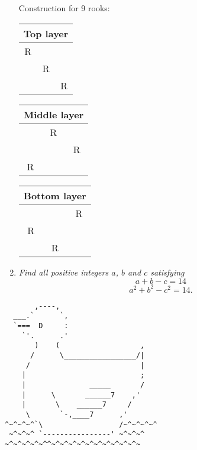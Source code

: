 \documentclass{article}
\begin{document}
\begin{enumerate}[1.]
Construction for 9 rooks:
\begin{table}[h]
\centering
\begin{tabular}{| c | c| c |}
\multicolumn{3}{c}{Top layer}\\
\hline
R& &\\
\hline
&R&\\
\hline
&&R\\
\hline
\end{tabular}
\quad
\begin{tabular}{| c | c| c |}
\multicolumn{3}{c}{Middle layer}\\
\hline
&R &\\
\hline
&&R\\
\hline
R&&\\
\hline
\end{tabular}
\quad
\begin{tabular}{| c | c| c |}
\multicolumn{3}{c}{Bottom layer}\\
\hline
& &R\\
\hline
R&&\\
\hline
&R&\\
\hline
\end{tabular}
\end{table}

\item %
{\itshape Find all positive integers $a$, $b$ and $c$ satisfying 
$$a + b - c = 14$$
$$a^2 + b^2 - c^2 = 14.$$}


\end{enumerate}

\vfill
\centering
\tiny
\begin{BVerbatim}
       ,----,
  ___.`      `,
  `===  D     :
    `'.      .'
       )    (                   ,
      /      \_________________/|
     /                          |
    |                           ;
    |               _____       /
    |      \       ______7    ,'
    |       \    ______7     /
     \       `-,____7      ,'   
^~^~^~^`\                  /~^~^~^~^
 ~^~^~^ `----------------' ~^~^~^
~^~^~^~^~^^~^~^~^~^~^~^~^~^~^~^~
\end{BVerbatim}
\end{document}
